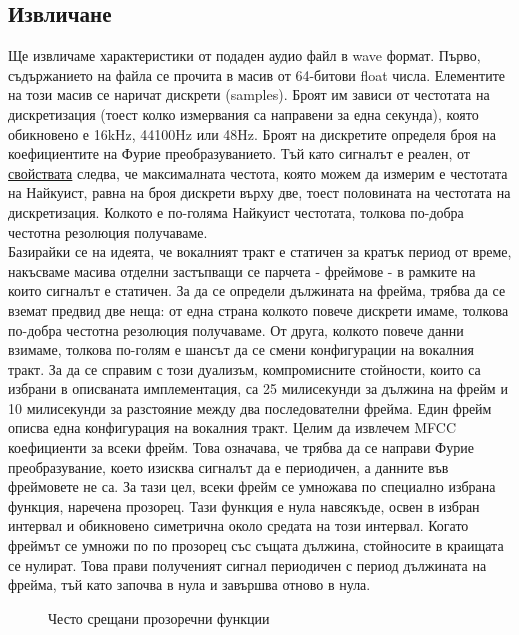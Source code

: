 \documentclass[main.tex]{subfiles}
\begin{document}
    \subsection{Извличане}
    Ще извличаме характеристики от подаден аудио файл в wave формат. Първо, съдържанието на файла се прочита в масив от 64-битови float числа. Елементите на този масив се наричат дискрети (samples). Броят им зависи от честотата на дискретизация (тоест колко измервания са направени за една секунда), която обикновено е 16kHz, 44100Hz или 48Hz. Броят на дискретите определя броя на коефициентите на Фурие преобразуванието. Тъй като сигналът е реален, от \hyperref[appendix:fourier:property]{свойствата} следва, че максималната честота, която можем да измерим е честотата на Найкуист, равна на броя дискрети върху две, тоест половината на честотата на дискретизация.
    Колкото е по-голяма Найкуист честотата, толкова по-добра честотна резолюция получаваме.\\
    Базирайки се на идеята, че вокалният тракт е статичен за кратък период от време, накъсваме масива отделни застъпващи се парчета - фреймове - в рамките на които сигналът е статичен. За да се определи дължината на фрейма, трябва да се вземат предвид две неща: от една страна колкото повече дискрети имаме, толкова по-добра честотна резолюция получаваме. От друга, колкото повече данни взимаме, толкова по-голям е шансът да се смени конфигурации на вокалния тракт. За да се справим с този дуализъм, компромисните стойности, които са избрани в описваната имплементация, са 25 милисекунди за дължина на фрейм и 10 милисекунди за разстояние между два последователни фрейма. Един фрейм описва една конфигурация на вокалния тракт.
    Целим да извлечем MFCC коефициенти за всеки фрейм. Това означава, че трябва да се направи Фурие преобразувание, което изисква сигналът да е периодичен, а данните във фреймовете не са. За тази цел, всеки фрейм се умножава по специално избрана функция, наречена прозорец. Тази функция е нула навсякъде, освен в избран интервал и обикновено симетрична около средата на този интервал. Когато фреймът се умножи по по прозорец със същата дължина, стойносите в краищата се нулират. Това прави полученият сигнал периодичен с период дължината на фрейма, тъй като започва в нула и завършва отново в нула.
    
    \begin{figure}[H]%
        \centering
            \hfill
            \vfill
        \caption{Често срещани прозоречни функции}%
        \label{fig:char:2}
    \end{figure}
\end{document}
